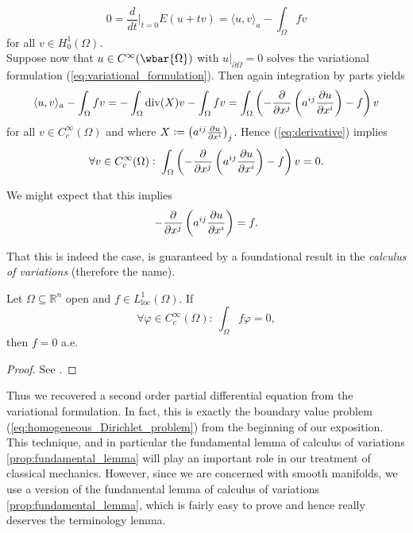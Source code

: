 \begin{equation}
	\label{eq:derivative}
	0 = \frac{d}{dt}\bigg\vert_{t = 0} E(u + tv) = \langle u, v \rangle_a - \int_\Omega f v
\end{equation}
\noindent for all $v \in H^1_0(\Omega)$.\\
Suppose now that $u \in C^\infty(\wbar{\Omega})$ with $u\vert_{\partial \Omega} = 0$ solves the variational formulation (\ref{eq:variational_formulation}). Then again integration by parts yields
\begin{equation*}
	\langle u, v \rangle_a - \int_\Omega f v = -\int_\Omega \mathrm{div}(X) v - \int_\Omega fv = \int_\Omega \del[3]{-\frac{\partial}{\partial x^j}\del[3]{a^{ij}\frac{\partial u}{\partial x^i}} - f} v
\end{equation*}
\noindent for all $v \in C^\infty_c(\Omega)$ and where $X := \del[1]{a^{ij}\frac{\partial u}{\partial x^i}}_j$. Hence (\ref{eq:derivative}) implies 
\begin{equation*}
	\forall v \in C^\infty_c(\Omega): \> \int_\Omega \del[3]{-\frac{\partial}{\partial x^j}\del[3]{a^{ij}\frac{\partial u}{\partial x^i}} - f} v = 0.
\end{equation*}

We might expect that this implies 
\begin{equation*}
	-\frac{\partial}{\partial x^j}\del[3]{a^{ij}\frac{\partial u}{\partial x^i}} = f.
\end{equation*}

That this is indeed the case, is guaranteed by a foundational result in the \emph{calculus of variations} (therefore the name).

\begin{proposition}
	\label{prop:fundamental_lemma}
	Let $\Omega \subseteq \mathbb{R}^n$ open and $f \in L^1_{\mathrm{loc}}(\Omega)$. If
	\begin{equation*}
		\forall \varphi \in C^\infty_c(\Omega): \> \int_\Omega f\varphi = 0,
	\end{equation*}
	\noindent then $f = 0$ a.e.
\end{proposition}

\begin{proof}
	See \cite[40]{struwe:fa:2014}.
\end{proof}

Thus we recovered a second order partial differential equation from the variational formulation. In fact, this is exactly the boundary value problem (\ref{eq:homogeneous_Dirichlet_problem}) from the beginning of our exposition. This technique, and in particular the fundamental lemma of calculus of variations \ref{prop:fundamental_lemma} will play an important role in our treatment of classical mechanics. However, since we are concerned with smooth manifolds, we use a version of the fundamental lemma of calculus of variations \ref{prop:fundamental_lemma}, which is fairly easy to prove and hence really deserves the terminology lemma.

